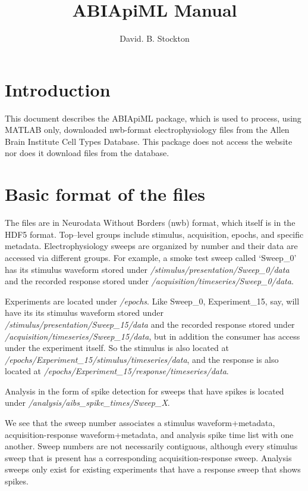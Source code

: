 \documentclass{article}
\title{ABIApiML Manual}
\author{David. B. Stockton}
\begin{document}
\maketitle

\section{Introduction}
This document describes the ABIApiML package, which is used to process, using MATLAB only, downloaded nwb-format electrophysiology files from the Allen Brain Institute Cell Types Database.  This package does not access the website nor does it download files from the database.

\section{Basic format of the files}
\begin{sloppypar}
The files are in Neurodata Without Borders (nwb) format, which itself is in the HDF5 format. Top--level groups include stimulus, acquisition, epochs, and specific metadata. Electrophysiology sweeps are organized by number and their data are accessed via different groups.  For example, a smoke test sweep called `Sweep\_0' has its stimulus waveform stored under \textit{/stimulus/presentation/Sweep\_0/data} and the recorded response stored under \textit{/acquisition/timeseries/Sweep\_0/data}. 
\end{sloppypar}

\begin{sloppypar}
Experiments are located under \textit{/epochs}.  Like Sweep\_0, Experiment\_15, say, will have its its stimulus waveform stored under \textit{/stimulus/presentation/Sweep\_15/data} and the recorded response stored under \textit{/acquisition/timeseries/Sweep\_15/data}, but in addition the consumer has access under the experiment itself.  So the stimulus is also located at \textit{/epochs/Experiment\_15/stimulus/timeseries/data}, and the response is also located at \textit{/epochs/Experiment\_15/response/timeseries/data}.
\end{sloppypar}

\begin{sloppypar}
Analysis in the form of spike detection for sweeps that have spikes is located under \textit{/analysis/aibs\_spike\_times/Sweep\_X}.
\end{sloppypar}

We see that the sweep number associates a stimulus waveform+metadata, acquisition-response waveform+metadata, and analysis spike time list with one another. Sweep numbers are not necessarily contiguous, although every stimulus sweep that is present has a corresponding acquisition-response sweep.  Analysis sweeps only exist for existing experiments that have a response sweep that shows spikes. 
\end{document}
